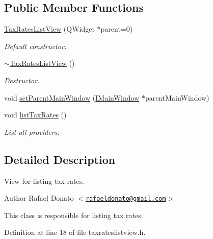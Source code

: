 \subsection*{\-Public \-Member \-Functions}
\begin{DoxyCompactItemize}
\item 
\hyperlink{class_tax_rates_list_view_a65d8cb8e96a42637e881fd437e03a8d5}{\-Tax\-Rates\-List\-View} (\-Q\-Widget $\ast$parent=0)
\begin{DoxyCompactList}\small\item\em \-Default constructor. \end{DoxyCompactList}\item 
\hyperlink{class_tax_rates_list_view_a8fb2bb8878614d6e6e286145c15ebc6e}{$\sim$\-Tax\-Rates\-List\-View} ()
\begin{DoxyCompactList}\small\item\em \-Destructor. \end{DoxyCompactList}\item 
void \hyperlink{class_tax_rates_list_view_a76ef66e1df106798676ec2ca26d296f5}{set\-Parent\-Main\-Window} (\hyperlink{class_i_main_window}{\-I\-Main\-Window} $\ast$parent\-Main\-Window)
\item 
void \hyperlink{class_tax_rates_list_view_a2150b9c35a0c1c16157b48c871c8b2f5}{list\-Tax\-Rates} ()
\begin{DoxyCompactList}\small\item\em \-List all providers. \end{DoxyCompactList}\end{DoxyCompactItemize}


\subsection{\-Detailed \-Description}
\-View for listing tax rates. 

\begin{DoxyAuthor}{\-Author}
\-Rafael \-Donato $<$\href{mailto:rafaeldonato@gmail.com}{\tt rafaeldonato@gmail.\-com}$>$
\end{DoxyAuthor}
\-This class is responsible for listing tax rates. 

\-Definition at line 18 of file taxrateslistview.\-h.




